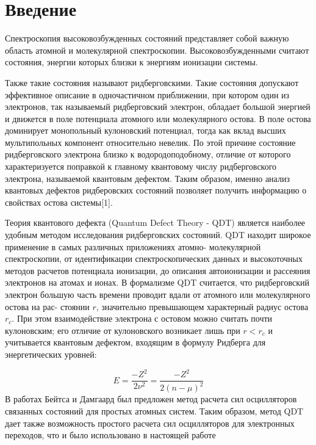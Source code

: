 \documentclass[a4paper]{article}
\title{}
\author{}
\date{2016-07-10}
\begin{document}
\clearpage\setcounter{page}{1}\pagestyle{Standard}


\clearpage\section{Введение}
\hypertarget{RefHeading4667463868395}{}\hypertarget{Toc453749978}{}Спектроскопия
высоковозбужденных состояний представляет собой важную область атомной и молекулярной спектроскопии. Высоковозбужденными считают состояния, энергии которых близки к энергиям ионизации системы.

Также такие состояния называют ридберговскими. Такие состоя\-ния допускают эффективное описание в одночастичном приближении, при ко\-тором один из электронов, так называемый ридберговский электрон, обладает большой энергией и движется в поле потенциала атомного или молекулярного остова. В поле остова доминирует монопольный кулоновский потенциал, тогда как вклад высших мультипольных компонент относительно невелик. По этой причине состояние ридберговского электрона близко к водородоподобному, отличие от которого характеризуется поправкой к главному квантовому числу ридберговского электрона, называемой квантовым дефектом. Таким образом, именно анализ квантовых дефектов ридберовских состояний позволяет получить информацию о свойствах остова системы[1]. 

Теория квантового дефекта (Quantum Defect Theory - QDT) является наиболее удобным методом исследования ридберговских состояний. QDT находит широкое применение в самых различных приложениях атомно- молекулярной спектроскопии, от идентификации спектроскопических данных и высокоточных методов расчетов потенциала ионизации, до описания автоионизации и рассеяния электронов на атомах и ионах. В формализме QDT считается, что ридберговский электрон большую часть времени проводит вдали от атомного или молекулярного остова на рас-
стоянии  $r$,
значительно превышающем характерный
радиус остова  $r_c$. При
этом взаимодействие электрона с остовом можно считать почти кулоновским; его отличие от кулоновского возникает лишь при
 $r<r_c$ и учитывается
квантовым дефектом, входящим в формулу Ридберга для энергетических уровней:

\begin{equation*}
E=\frac{-Z^2}{2\nu ^2}=\frac{-Z^2}{2(n-\mu )^2}
\end{equation*}
В работах Бейтса и Дамгаард был предложен метод расчета сил осцилляторов связанных состояний для простых атомных систем. Таким образом, метод QDT дает также возможность простого расчета сил осцилляторов для электронных переходов, что и было использовано в настоящей работе
\end{document}
